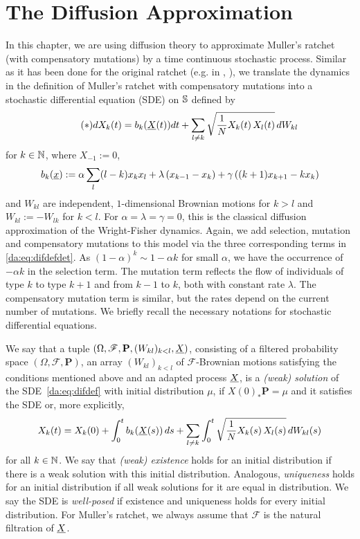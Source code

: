 \section{The Diffusion Approximation}

In this chapter, we are using diffusion theory to approximate Muller's ratchet (with compensatory
mutations) by a time continuous stochastic process. Similar as it has been done for the original
ratchet (e.g. in \cite{stephan_advance_1993}, \citet{etheridge_how_2008}), we translate the
dynamics in the definition of Muller's ratchet with compensatory mutations into a stochastic differential
equation (SDE) on $\mathbb{S}$ defined by
\begin{align} \label{da:eq:difdef}\tag{$\ast$}
d X_{k} \! \left( t \right) = 
	b_k(\underline{X} \! \left( t \right)) dt 
  + \sum_{l \not= k} \sqrt{\frac{1}{N} X_{k} \! \left( t \right) X_{l} \! \left( t \right) } \, dW_{kl}
\end{align}
for $k \in \mathbb{N} $, where $X_{-1} := 0$, 
\begin{align} \label{da:eq:difdefdet}
 b_k(\underline{x}) := 	
 \alpha \sum_l (l-k) x_k x_l 
  + \lambda \left( x_{k-1} - x_k \right)
  + \gamma \left( (k+1) x_{k+1} - k x_k \right) 
\end{align}
and $W_{kl}$ are independent, $1$-dimensional Brownian motions for $k>l$ and
$W_{kl} := -W_{lk}$ for $k<l$.
For $\alpha = \lambda = \gamma = 0$, this is the classical diffusion approximation of
the Wright-Fisher dynamics. Again, we add selection, mutation and compensatory mutations to this
model via the three corresponding terms in \eqref{da:eq:difdefdet}. As $(1-\alpha)^k \sim 1 - \alpha
k$ for small $\alpha$, we have the occurrence of $-\alpha k$ in the selection term. The mutation
term reflects the flow of individuals of type $k$ to type $k+1$ and from $k-1$ to $k$, both with
constant rate $\lambda$. The compensatory mutation term is similar, but the rates depend on the
current number of mutations. We briefly recall the necessary notations for
stochastic differential equations.

\begin{Definition}[SDE]
We say that a tuple $(\Omega,\mathscr{F},\mathbf{P},(W_{kl})_{k<l},\underline{X})$,
consisting of a filtered probability space $(\Omega,\mathscr{F},\mathbf{P})$, an array
$(W_{kl})_{k<l}$ of $\mathscr{F}$-Brownian motions satisfying the conditions
mentioned above and an adapted process $\underline{X}$, is a \emph{(weak) solution} of
the SDE~\eqref{da:eq:difdef} with initial distribution $\mu$, if
$X(0)_*\mathbf{P} = \mu$ and it satisfies the SDE or, more explicitly,
\[ 
X_{k} \! \left( t \right) = X_{k} \! \left( 0 \right) + \int_0^t b_k(\underline{X} \! \left( s \right)) \, ds 
  + \sum_{l \not= k} \int_0^t \sqrt{\frac{1}{N} X_{k} \! \left( s \right) X_{l} \! \left( s \right) }
  \, dW_{kl}(s)
\]
for all $k \in \mathbb{N}$. We say that \emph{(weak) existence} holds for an initial
distribution if there is a weak solution with this initial distribution.
Analogous, \emph{uniqueness} holds for an initial distribution if all weak
solutions for it are equal in distribution. We say the SDE is \emph{well-posed}
if existence and uniqueness holds for every initial distribution. For Muller's
ratchet, we always assume that $\mathscr{F}$ is the natural filtration of $\underline{X}$.
\end{Definition}

